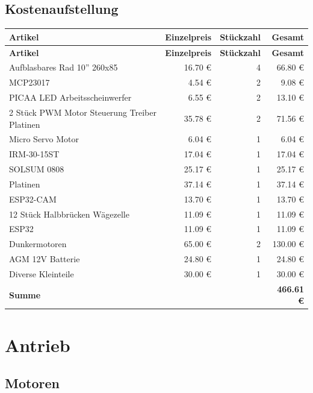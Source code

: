 \documentclass[ngerman,12pt,a4paper]{article}
\begin{document}
		\subsection{Kostenaufstellung} %
			\begin{center}
				\begin{longtable}{| p{8.2cm} | r | r | r |}
					\hline
					\textbf{Artikel} & \textbf{Einzelpreis} & \textbf{Stückzahl} & \textbf{Gesamt} \\
					\hline
					\endfirsthead
					\hline
					\textbf{Artikel} & \textbf{Einzelpreis} & \textbf{Stückzahl} & \textbf{Gesamt} \\
					\hline
					\endhead
					\hline
					Aufblasbares Rad 10'' 260x85  & 16.70 € & 4 & 66.80 € \\ \hline
					MCP23017 & 4.54 € & 2 & 9.08 € \\ \hline
					PICAA LED Arbeitsscheinwerfer & 6.55 € & 2 & 13.10 € \\ \hline
					2 Stück PWM Motor Steuerung Treiber Platinen & 35.78 € & 2 & 71.56 € \\ \hline
					Micro Servo Motor & 6.04 € & 1 & 6.04 € \\ \hline
					IRM-30-15ST & 17.04 € & 1 & 17.04 € \\ \hline
					SOLSUM 0808 & 25.17 € & 1 & 25.17 € \\ \hline
					Platinen & 37.14 € & 1 & 37.14 € \\ \hline
					ESP32-CAM & 13.70 € & 1 & 13.70 € \\ \hline
					12 Stück Halbbrücken Wägezelle & 11.09 € & 1 & 11.09 € \\ \hline
					ESP32 & 11.09 € & 1 & 11.09 € \\ \hline
					Dunkermotoren & 65.00 € & 2 & 130.00 € \\ \hline
					AGM 12V Batterie & 24.80 € & 1 & 24.80 € \\ \hline
					Diverse Kleinteile & 30.00 € & 1 & 30.00 € \\ \hline
					\textbf{Summe} & & & \textbf{466.61 €} \\
					\hline
				\end{longtable}
			\end{center}
			\newpage
	\section{Antrieb}
	
		\subsection{Motoren} %
		
\end{document}
